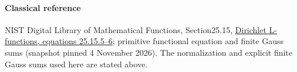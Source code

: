 \documentclass[11pt]{article}
\begin{document}


























\paragraph{Classical reference}NIST Digital Library of Mathematical Functions, Section25.15, \href{https://dlmf.nist.gov/25.15#E5}{Dirichlet L-functions, equations 25.15.5--6}; primitive functional equation and finite Gauss sums (snapshot pinned 4 November 2026). The normalization and explicit finite Gauss sums used here are stated above.
\end{document}
